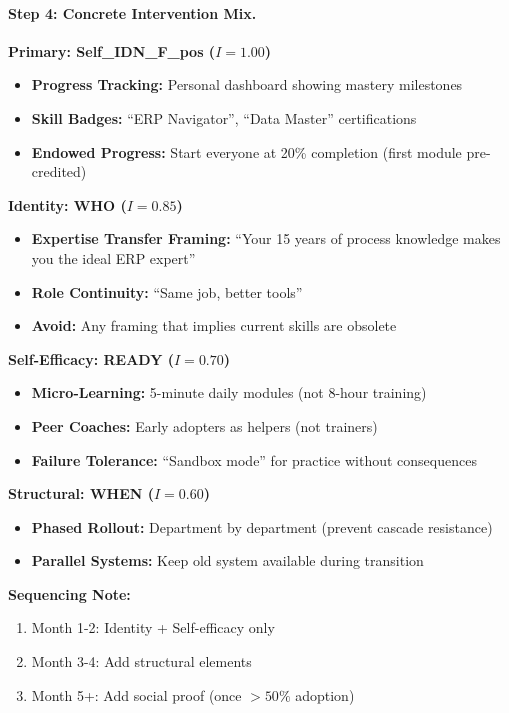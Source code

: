 \paragraph{Step 4: Concrete Intervention Mix.}

\begin{tcolorbox}[colback=green!5!white, colframe=green!75!black,
    title=\textbf{ERP Adoption Intervention Package}]

\textbf{Primary: Self\_IDN\_F\_pos ($I = 1.00$)}
\begin{itemize}[nosep]
    \item \textbf{Progress Tracking:} Personal dashboard showing mastery milestones
    \item \textbf{Skill Badges:} ``ERP Navigator'', ``Data Master'' certifications
    \item \textbf{Endowed Progress:} Start everyone at 20\% completion (first module pre-credited)
\end{itemize}

\textbf{Identity: WHO ($I = 0.85$)}
\begin{itemize}[nosep]
    \item \textbf{Expertise Transfer Framing:} ``Your 15 years of process knowledge makes you the ideal ERP expert''
    \item \textbf{Role Continuity:} ``Same job, better tools''
    \item \textbf{Avoid:} Any framing that implies current skills are obsolete
\end{itemize}

\textbf{Self-Efficacy: READY ($I = 0.70$)}
\begin{itemize}[nosep]
    \item \textbf{Micro-Learning:} 5-minute daily modules (not 8-hour training)
    \item \textbf{Peer Coaches:} Early adopters as helpers (not trainers)
    \item \textbf{Failure Tolerance:} ``Sandbox mode'' for practice without consequences
\end{itemize}

\textbf{Structural: WHEN ($I = 0.60$)}
\begin{itemize}[nosep]
    \item \textbf{Phased Rollout:} Department by department (prevent cascade resistance)
    \item \textbf{Parallel Systems:} Keep old system available during transition
\end{itemize}

\textbf{Sequencing Note:}
\begin{enumerate}[nosep]
    \item Month 1-2: Identity + Self-efficacy only
    \item Month 3-4: Add structural elements
    \item Month 5+: Add social proof (once $> 50\%$ adoption)
\end{enumerate}

\end{tcolorbox}

